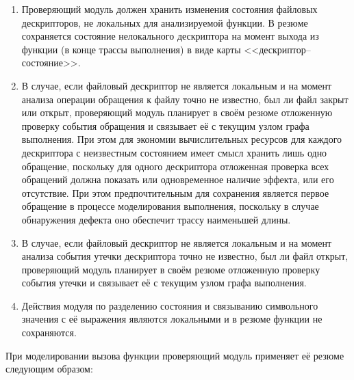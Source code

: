 \begin{enumerate}
 \item Проверяющий модуль должен хранить изменения состояния файловых дескрипторов, не локальных для анализируемой функции. В резюме сохраняется состояние нелокального дескриптора на момент выхода из функции (в конце трассы выполнения) в виде карты <<дескриптор--состояние>>.
 \item В случае, если файловый дескриптор не является локальным и на момент анализа операции обращения к файлу точно не известно, был ли файл закрыт или открыт, проверяющий модуль планирует в своём резюме отложенную проверку события обращения и связывает её с текущим узлом графа выполнения. При этом для экономии вычислительных ресурсов для каждого дескриптора с неизвестным состоянием имеет смысл хранить лишь одно обращение, поскольку для одного дескриптора отложенная проверка всех обращений должна показать или одновременное наличие эффекта, или его отсутствие. При этом предпочтительным для сохранения является первое обращение в процессе моделирования выполнения, поскольку в случае обнаружения дефекта оно обеспечит трассу наименьшей длины.
 \item В случае, если файловый дескриптор не является локальным и на момент анализа события утечки дескриптора точно не известно, был ли файл открыт, проверяющий модуль планирует в своём резюме отложенную проверку события утечки и связывает её с текущим узлом графа выполнения.

 \item Действия модуля по разделению состояния и связыванию символьного значения с её выражения являются локальными и в резюме функции не сохраняются.
\end{enumerate}

При моделировании вызова функции проверяющий модуль применяет её резюме следующим образом:

